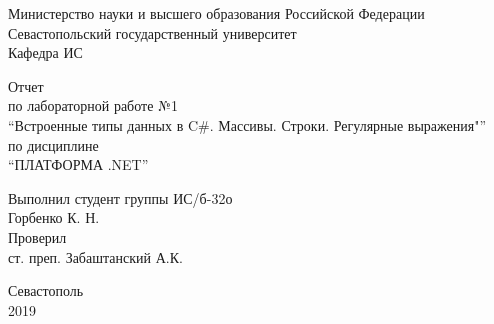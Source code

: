 \documentclass[a4paper,14pt]{extarticle}
\newcommand{\mylabnumber}{1}
\newcommand{\mylabtitle}{Встроенные типы данных в C\#. Массивы. Строки. Регулярные выражения}
\newcommand{\mysubject}{Платформа .NET}
\newcommand{\mylecturer}{ст. преп. Забаштанский А.К.}
\begin{document}


    \begin{titlepage}
        
        \thispagestyle{empty}
        
        \begin{center}
            
            Министерство науки и высшего образования Российской Федерации \\
            Севастопольский государственный университет \\
            Кафедра ИС
            
            \vfill

            Отчет \\
            по лабораторной работе №\mylabnumber \\
            \enquote{\mylabtitle"} \\
            по дисциплине \\
            \enquote{\MakeTextUppercase{\mysubject}}

        \end{center}

        \vspace{1cm}

        \noindent\hspace{7.5cm} Выполнил студент группы ИС/б-32о \\
        \null\hspace{7.5cm} Горбенко К. Н. \\
        \null\hspace{7.5cm} Проверил \\
        \null\hspace{7.5cm} \mylecturer

        \vfill

        \begin{center}
            Севастополь \\
            2019
        \end{center}

    \end{titlepage}
\end{document}
